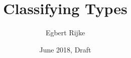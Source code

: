 \documentclass[twosided]{memoir}
\title{Classifying Types}
\author{Egbert Rijke}
\date{June 2018, Draft}
\begin{document}
\frontmatter

\begin{titlingpage}
\maketitle
\end{titlingpage}

\begin{comment}
\clearpage
\thispagestyle{empty}
\par
\vspace*{.35\textheight}{\begin{flushright}With infinite gratitude I dedicate this thesis to my parents.\par\end{flushright}}

\clearpage
\end{comment}

\tableofcontents



\mainmatter

























%



\backmatter

\printbibliography
\end{document}
